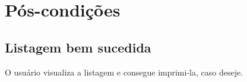 \documentclass[11pt, a4paper,oneside]{book}
\begin{document}
%
%
%
%

\section{Pós-condições}

\subsection{Listagem bem sucedida}

O usuário visualiza a listagem e consegue imprimi-la, caso deseje.

%

	
\end{document}
